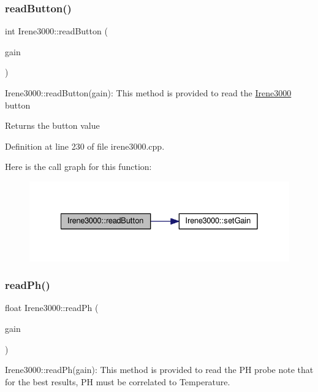 \subsubsection{\texorpdfstring{read\+Button()}{readButton()}}
{\footnotesize\ttfamily int Irene3000\+::read\+Button (\begin{DoxyParamCaption}\item[{ads\+Gain\+\_\+t}]{gain }\end{DoxyParamCaption})}

Irene3000\+::read\+Button(gain)\+: This method is provided to read the \hyperlink{class_irene3000}{Irene3000} button

\begin{DoxyReturn}{Returns}
the button value 
\end{DoxyReturn}


Definition at line 230 of file irene3000.\+cpp.

Here is the call graph for this function\+:
\nopagebreak
\begin{figure}[H]
\begin{center}
\leavevmode
\includegraphics[width=328pt]{d6/d03/class_irene3000_ae0e0a5b773c3625b44c1d113c76a1540_cgraph}
\end{center}
\end{figure}
\mbox{\label{class_irene3000_abf3db725fabb0634ec889b32068a5eec}} 
\subsubsection{\texorpdfstring{read\+Ph()}{readPh()}}
{\footnotesize\ttfamily float Irene3000\+::read\+Ph (\begin{DoxyParamCaption}\item[{ads\+Gain\+\_\+t}]{gain }\end{DoxyParamCaption})}

Irene3000\+::read\+Ph(gain)\+: This method is provided to read the PH probe note that for the best results, PH must be correlated to Temperature.

